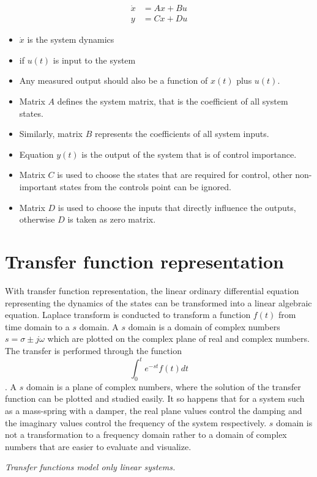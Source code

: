 \begin{align}
	\dot{x} &= Ax + Bu\\
	y &= Cx + Du
\end{align}

\begin{itemize}
	\item $\dot{x}$ is the system dynamics
	\item if $u(t)$ is input to the system
	\item Any measured output should also be a function of $x(t)$ plus $u(t)$.
	\item Matrix $A$ defines the system matrix, that is the coefficient of all system states.
	\item Similarly, matrix $B$ represents the coefficients of all system inputs.
	\item Equation $y(t)$ is the output of the system that is of control importance.
	\item Matrix $C$ is used to choose the states that are required for control, other non-important states from the controls point can be ignored.
	\item Matrix $D$ is used to choose the inputs that directly influence the outputs, otherwise $D$ is taken as zero matrix.
\end{itemize}

\section{Transfer function representation}

With transfer function representation, the linear ordinary differential equation representing the dynamics of the states can be transformed into a linear algebraic equation. Laplace transform is conducted to transform a function $f(t)$ from time domain to a $s$ domain. A $s$ domain is a domain of complex numbers $s = \sigma \pm j \omega$ which are plotted on the complex plane of real and complex numbers. The transfer is performed through the function $$ \int_{0}^{t} e^{-st} f(t) dt $$. A $s$ domain is a plane of complex numbers, where the solution of the transfer function can be plotted and studied easily. It so happens that for a system such as a mass-spring with a damper, the real plane values control the damping and the imaginary values control the frequency of the system respectively. $s$ domain is not a transformation to a frequency domain rather to a domain of complex numbers that are easier to evaluate and visualize.

\textit{Transfer functions model only linear systems.}

